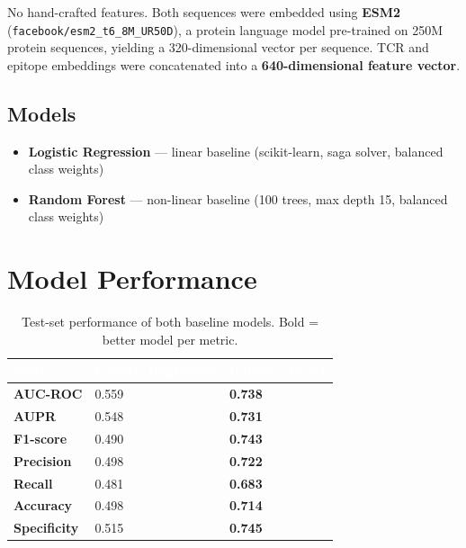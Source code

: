 \documentclass[11pt,a4paper]{article}
\begin{document}
No hand-crafted features. Both sequences were embedded using
\textbf{ESM2} (\texttt{facebook/esm2\_t6\_8M\_UR50D}), a protein language model
pre-trained on 250M protein sequences, yielding a 320-dimensional vector per sequence.
TCR and epitope embeddings were concatenated into a \textbf{640-dimensional feature vector}.

\subsection{Models}
\begin{itemize}[leftmargin=1.4em, itemsep=2pt]
  \item \textbf{Logistic Regression} --- linear baseline
        (scikit-learn, saga solver, balanced class weights)
  \item \textbf{Random Forest} --- non-linear baseline
        (100 trees, max depth 15, balanced class weights)
\end{itemize}

\section{Model Performance}

\vspace{4pt}
\begin{table}[h!]
\centering
\renewcommand{\arraystretch}{1.3}
\begin{tabularx}{\linewidth}{>{\bfseries}l X X}
\toprule
\rowcolor{mainblue}
\textcolor{white}{Metric} &
\textcolor{white}{Logistic Regression} &
\textcolor{white}{Random Forest} \\
\midrule
\rowcolor{lightblue}
AUC-ROC     & 0.559 & \textbf{0.738} \\
AUPR        & 0.548 & \textbf{0.731} \\
\rowcolor{lightblue}
F1-score    & 0.490 & \textbf{0.743} \\
Precision   & 0.498 & \textbf{0.722} \\
\rowcolor{lightblue}
Recall      & 0.481 & \textbf{0.683} \\
Accuracy    & 0.498 & \textbf{0.714} \\
\rowcolor{lightblue}
Specificity & 0.515 & \textbf{0.745} \\
\bottomrule
\end{tabularx}
\caption{Test-set performance of both baseline models. Bold = better model per metric.}
\end{table}
\end{document}
